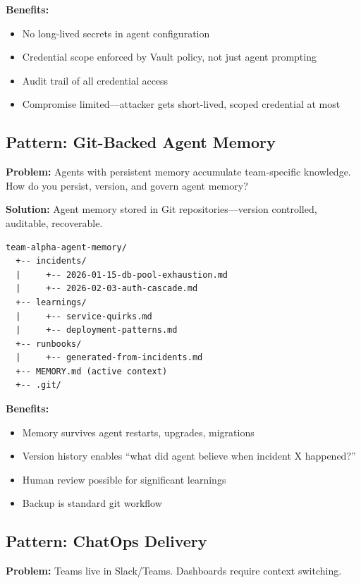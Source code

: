 \textbf{Benefits:}
\begin{itemize}
    \item No long-lived secrets in agent configuration
    \item Credential scope enforced by Vault policy, not just agent prompting
    \item Audit trail of all credential access
    \item Compromise limited---attacker gets short-lived, scoped credential at most
\end{itemize}

\subsection{Pattern: Git-Backed Agent Memory}
\label{subsec:git-memory}

\textbf{Problem:} Agents with persistent memory accumulate team-specific knowledge. How do you persist, version, and govern agent memory?

\textbf{Solution:} Agent memory stored in Git repositories---version controlled, auditable, recoverable.

\begin{lstlisting}[caption={Git-Backed Memory Structure}]
team-alpha-agent-memory/
  +-- incidents/
  |     +-- 2026-01-15-db-pool-exhaustion.md
  |     +-- 2026-02-03-auth-cascade.md
  +-- learnings/
  |     +-- service-quirks.md
  |     +-- deployment-patterns.md
  +-- runbooks/
  |     +-- generated-from-incidents.md
  +-- MEMORY.md (active context)
  +-- .git/
\end{lstlisting}

\textbf{Benefits:}
\begin{itemize}
    \item Memory survives agent restarts, upgrades, migrations
    \item Version history enables ``what did agent believe when incident X happened?''
    \item Human review possible for significant learnings
    \item Backup is standard git workflow
\end{itemize}

\subsection{Pattern: ChatOps Delivery}
\label{subsec:chatops}

\textbf{Problem:} Teams live in Slack/Teams. Dashboards require context switching.

